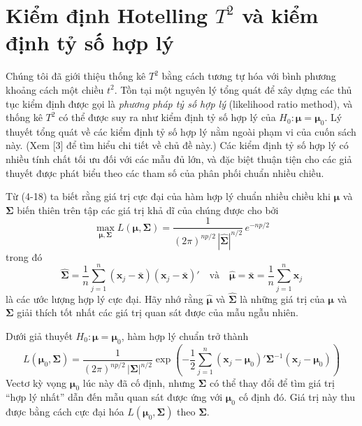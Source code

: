 
\section{Kiểm định Hotelling \texorpdfstring{\(T^2\)}{T2} và kiểm định tỷ số hợp lý}


Chúng tôi đã giới thiệu thống kê $T^2$ bằng cách tương tự hóa với bình phương khoảng cách một chiều $t^2$. Tồn tại một nguyên lý tổng quát để xây dựng các thủ tục kiểm định được gọi là \emph{phương pháp tỷ số hợp lý} (likelihood ratio method), và thống kê $T^2$ có thể được suy ra như kiểm định tỷ số hợp lý của $H_0: \boldsymbol{\mu} = \boldsymbol{\mu}_0$. Lý thuyết tổng quát về các kiểm định tỷ số hợp lý nằm ngoài phạm vi của cuốn sách này. (Xem [3] để tìm hiểu chi tiết về chủ đề này.) Các kiểm định tỷ số hợp lý có nhiều tính chất tối ưu đối với các mẫu đủ lớn, và đặc biệt thuận tiện cho các giả thuyết được phát biểu theo các tham số của phân phối chuẩn nhiều chiều.

Từ (4-18) ta biết rằng giá trị cực đại của hàm hợp lý chuẩn nhiều chiều khi $\boldsymbol{\mu}$ và $\boldsymbol{\Sigma}$ biến thiên trên tập các giá trị khả dĩ của chúng được cho bởi
\begin{equation}
\max_{\boldsymbol{\mu},\boldsymbol{\Sigma}} L(\boldsymbol{\mu},\boldsymbol{\Sigma}) = \frac{1}{(2\pi)^{np/2}\,|\hat{\boldsymbol{\Sigma}}|^{n/2}}\, e^{-np/2}
\tag{5-10}
\end{equation}
trong đó
\[
\hat{\boldsymbol{\Sigma}} = \frac{1}{n}\sum_{j=1}^{n}(\mathbf{x}_j-\bar{\mathbf{x}})(\mathbf{x}_j-\bar{\mathbf{x}})'
\quad\text{và}\quad
\hat{\boldsymbol{\mu}} = \bar{\mathbf{x}} = \frac{1}{n}\sum_{j=1}^{n}\mathbf{x}_j
\]
là các ước lượng hợp lý cực đại. Hãy nhớ rằng $\hat{\boldsymbol{\mu}}$ và $\hat{\boldsymbol{\Sigma}}$ là những giá trị của $\boldsymbol{\mu}$ và $\boldsymbol{\Sigma}$ giải thích tốt nhất các giá trị quan sát được của mẫu ngẫu nhiên.

Dưới giả thuyết $H_0: \boldsymbol{\mu} = \boldsymbol{\mu}_0$, hàm hợp lý chuẩn trở thành
\[
L(\boldsymbol{\mu}_0,\boldsymbol{\Sigma}) = \frac{1}{(2\pi)^{np/2}\,|\boldsymbol{\Sigma}|^{n/2}}
\exp\!\left(-\frac{1}{2}\sum_{j=1}^{n}(\mathbf{x}_j-\boldsymbol{\mu}_0)'\boldsymbol{\Sigma}^{-1}(\mathbf{x}_j-\boldsymbol{\mu}_0)\right)
\]
Vectơ kỳ vọng $\boldsymbol{\mu}_0$ lúc này đã cố định, nhưng $\boldsymbol{\Sigma}$ có thể thay đổi để tìm giá trị ``hợp lý nhất'' dẫn đến mẫu quan sát được ứng với $\boldsymbol{\mu}_0$ cố định đó. Giá trị này thu được bằng cách cực đại hóa $L(\boldsymbol{\mu}_0,\boldsymbol{\Sigma})$ theo $\boldsymbol{\Sigma}$.


